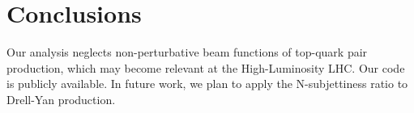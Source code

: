 \section{Conclusions}\label{sec:conclusions}

Our analysis neglects non-perturbative beam functions of top-quark pair
production, which may become relevant at the High-Luminosity LHC. Our
code is publicly available. In future work, we plan to apply the
N-subjettiness ratio to Drell-Yan production.

